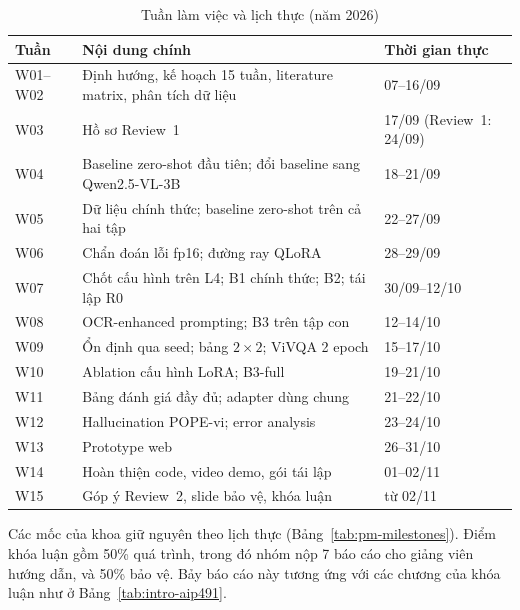 \begin{table}[htbp]
\caption{Tuần làm việc và lịch thực (năm 2026)}
\label{tab:pm-weeks}
\centering
\small
\begin{tabular}{p{}p{}p{}}
\toprule
\textbf{Tuần} & \textbf{Nội dung chính} & \textbf{Thời gian thực} \\
\midrule
W01--W02 & Định hướng, kế hoạch 15 tuần, literature matrix, phân tích dữ liệu & 07--16/09 \\
W03 & Hồ sơ Review~1 & 17/09 (Review~1: 24/09) \\
W04 & Baseline zero-shot đầu tiên; đổi baseline sang Qwen2.5-VL-3B & 18--21/09 \\
W05 & Dữ liệu chính thức; baseline zero-shot trên cả hai tập & 22--27/09 \\
W06 & Chẩn đoán lỗi fp16; đường ray QLoRA & 28--29/09 \\
W07 & Chốt cấu hình trên L4; B1 chính thức; B2; tái lập R0 & 30/09--12/10 \\
W08 & OCR-enhanced prompting; B3 trên tập con & 12--14/10 \\
W09 & Ổn định qua seed; bảng $2\times2$; ViVQA 2 epoch & 15--17/10 \\
W10 & Ablation cấu hình LoRA; B3-full & 19--21/10 \\
W11 & Bảng đánh giá đầy đủ; adapter dùng chung & 21--22/10 \\
W12 & Hallucination POPE-vi; error analysis & 23--24/10 \\
W13 & Prototype web & 26--31/10 \\
W14 & Hoàn thiện code, video demo, gói tái lập & 01--02/11 \\
W15 & Góp ý Review~2, slide bảo vệ, khóa luận & từ 02/11 \\
\bottomrule
\end{tabular}
\end{table}

Các mốc của khoa giữ nguyên theo lịch thực (Bảng~\ref{tab:pm-milestones}). Điểm
khóa luận gồm 50\% quá trình, trong đó nhóm nộp 7 báo cáo cho giảng viên hướng
dẫn, và 50\% bảo vệ. Bảy báo cáo này tương ứng với các chương của khóa luận như ở Bảng~\ref{tab:intro-aip491}.

